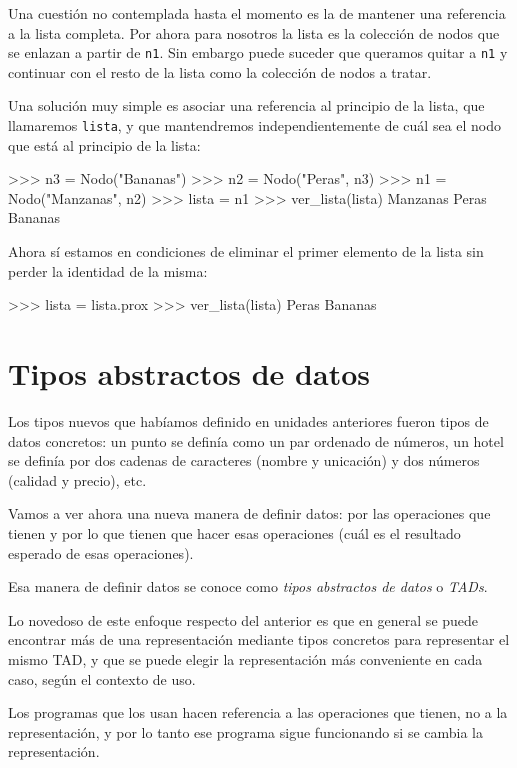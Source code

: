 Una cuestión no contemplada hasta el momento es la de mantener una referencia
a la lista completa. Por ahora para nosotros la lista es la colección de nodos
que se enlazan a partir de \lstinline|n1|. Sin embargo puede suceder que queramos
quitar a \lstinline|n1| y continuar con el resto de la lista como la colección de
nodos a tratar.

Una solución muy simple es asociar una referencia al principio de la lista,
que llamaremos \lstinline|lista|, y que mantendremos independientemente de cuál sea
el nodo que está al principio de la lista:

\begin{codigo-python-sn}
>>> n3 = Nodo("Bananas")
>>> n2 = Nodo("Peras", n3)
>>> n1 = Nodo("Manzanas", n2)
>>> lista = n1
>>> ver_lista(lista)
Manzanas
Peras
Bananas
\end{codigo-python-sn}

Ahora sí estamos en condiciones de eliminar el primer elemento de la lista
sin perder la identidad de la misma:

\begin{codigo-python-sn}
>>> lista = lista.prox
>>> ver_lista(lista)
Peras
Bananas
\end{codigo-python-sn}

\section{Tipos abstractos de datos}

Los tipos nuevos que habíamos definido en unidades anteriores fueron tipos de
datos concretos: un punto se definía como un par ordenado de números, un hotel
se definía por dos cadenas de caracteres (nombre y unicación) y dos números
(calidad y precio), etc.

Vamos a ver ahora una nueva manera de definir datos: por las
operaciones que tienen y por lo que tienen que hacer esas
operaciones (cuál es el resultado esperado de esas operaciones).

Esa manera de definir datos se conoce como \emph{tipos abstractos de datos} o
\emph{TADs}.

Lo novedoso de este enfoque respecto del anterior es que en general se puede
encontrar más de una representación mediante tipos concretos para representar
el mismo TAD, y que se puede elegir la representación más conveniente en cada
caso, según el contexto de uso.

Los programas que los usan hacen referencia a las operaciones que tienen, no a
la representación, y por lo tanto ese programa sigue funcionando si se cambia
la representación.

